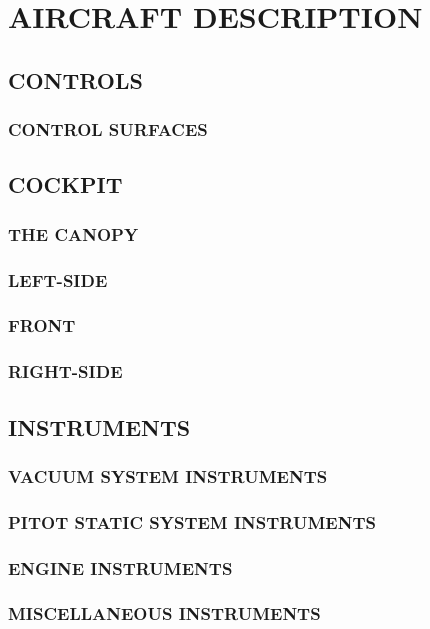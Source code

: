 \chapter{AIRCRAFT DESCRIPTION}
\minitoc
\cleardoublepage


\section{CONTROLS}
\subsection{CONTROL SURFACES}

\section{COCKPIT}
\subsection{THE CANOPY}
\subsection{LEFT-SIDE}
\subsection{FRONT}
\subsection{RIGHT-SIDE}


\section{INSTRUMENTS}
\subsection{VACUUM SYSTEM INSTRUMENTS}
\subsection{PITOT STATIC SYSTEM INSTRUMENTS}
\subsection{ENGINE INSTRUMENTS}
\subsection{MISCELLANEOUS INSTRUMENTS}


